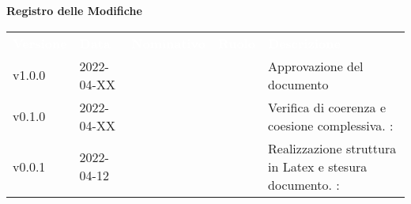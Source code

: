

{\LARGE{\textbf{Registro delle Modifiche}}} \\
\begin{table}[!htbp]
	\renewcommand{\arraystretch}{1.5}
	\begin{tabular}{ m{}<{\centering}  m{}<{\centering}  m{}<{\centering}  m{}<{\centering}  m{}<{\centering} }
		\rowcolor{darkblue}
		\textcolor{white}{\textbf{Versione}} & \textcolor{white}{\textbf{Data}} & \textcolor{white}{\textbf{Nominativo}} & \textcolor{white}{\textbf{Ruolo}} & \textcolor{white}{\textbf{Descrizione}}                              \\
		v1.0.0                               & 2022-04-XX                       &                                        & \RE                               & Approvazione del documento                                           \\

		v0.1.0                               & 2022-04-XX                      & \PV                                    & \AN                               & Verifica di coerenza e coesione complessiva. \VE: \textit{}          \\

		v0.0.1                               & 2022-04-12                       & \PV                                    & \AN                               & Realizzazione struttura in Latex e stesura documento. \VE: \textit{} \\
	\end{tabular}
\end{table}

\pagebreak